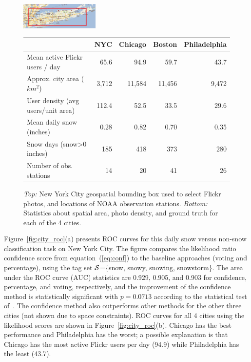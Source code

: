 \begin{figure}
\begin{center}
\includegraphics[width=0.35\textwidth]{plots/nyc_stations.png} 
\end{center}
\begin{center}
{\small{
\newcommand{\spc}{\hspace{2pt}}
\begin{tabular} {|@{\spc}l@{\spc}|@{\spc}r@{\spc}|@{\spc}r@{\spc}|@{\spc}r@{\spc}|@{\spc}r@{\spc}|} 
\hline 
\textbf{} &{NYC}  &{Chicago} &{Boston}&{Philadelphia} \tabularnewline
\hline 
{Mean active Flickr users / day} &{65.6} &{94.9} &{59.7} &{43.7} \tabularnewline
\hline 
{Approx. city area ($km^2$)} &{3,712} &{11,584} &{11,456} &{9,472}  \tabularnewline
\hline 
{User density (avg users/unit area)} &{112.4} &{52.5} &{33.5} &{29.6} \tabularnewline
\hline 
{Mean daily snow (inches)} &{0.28} &{0.82} &{0.70} &{0.35} \tabularnewline
\hline 
{Snow days (snow>0 inches)} &{185} &{418} &{373} &{280} \tabularnewline
\hline 
{Number of obs. stations} &{14} &{20} &{41} &{26} \tabularnewline
\hline 
\end{tabular}}}
\end{center}
\vspace{-12pt}
 \caption {\textit{Top:} New York City geospatial bounding box used to select Flickr photos, and locations of NOAA observation stations. \textit{Bottom:} Statistics about spatial area, photo density, and ground truth for each of the 4 cities.}
\label{tab:city_statistics} 
\end{figure}




Figure~\ref{fig:city_roc}(a) presents ROC curves for this
daily snow versus non-snow classification task on New York City. The figure compares the likelihood
ratio confidence score from equation~(\ref{eq:conf}) to the baseline
approaches (voting and percentage), using the tag set
${\cal S}$=\{snow, snowy, snowing, snowstorm\}.
The area under the ROC curve (AUC) statistics are 0.929, 0.905, and 0.903 for confidence, percentage, and voting, respectively, 
and the improvement of the confidence method is statistically significant 
with $p=0.0713$ according to the statistical test of~\cite{auc}.
The confidence method also outperforms other methods for the other three cities (not shown due to
space constraints).  ROC curves for all 4 cities using the likelihood
scores are shown in Figure~\ref{fig:city_roc}(b). Chicago has the best
performance and Philadelphia has the worst; a possible explanation
is that Chicago has the most active Flickr users per
day (94.9) while Philadelphia has the least (43.7).

